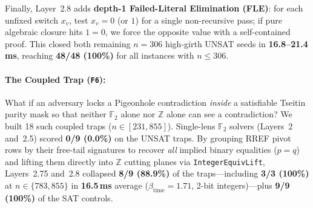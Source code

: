 \documentclass[11pt]{article}
\begin{document}
Finally, Layer~2.8 adds \textbf{depth-1 Failed-Literal Elimination (FLE)}: for each unfixed switch $x_v$, test $x_v = 0$ (or $1$) for a single non-recursive pass; if pure algebraic closure hits $1 = 0$, we force the opposite value with a self-contained proof. This closed both remaining $n = 306$ high-girth UNSAT seeds in \textbf{16.8--21.4\,ms}, reaching \textbf{48/48 (100\%)} for all instances with $n \le 306$.

\paragraph{The Coupled Trap (\texttt{F6}):} What if an adversary locks a Pigeonhole contradiction \emph{inside} a satisfiable Tseitin parity mask so that neither $\mathbb{F}_2$ alone nor $\mathbb{Z}$ alone can see a contradiction? We built 18 such coupled traps ($n \in [231, 855]$). Single-lens $\mathbb{F}_2$ solvers (Layers~2 and~2.5) scored \textbf{0/9 (0.0\%)} on the UNSAT traps. By grouping RREF pivot rows by their free-tail signatures to recover \emph{all} implied binary equalities ($p = q$) and lifting them directly into $\mathbb{Z}$ cutting planes via \texttt{IntegerEquivLift}, Layers~2.75 and~2.8 collapsed \textbf{8/9 (88.9\%)} of the traps---including \textbf{3/3 (100\%)} at $n \in \{783, 855\}$ in \textbf{16.5\,ms} average ($\beta_{\text{time}} = 1.71$, 2-bit integers)---plus \textbf{9/9 (100\%)} of the SAT controls.
\end{document}
